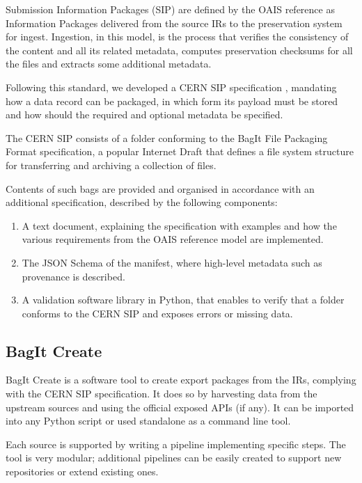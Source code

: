 \documentclass[11pt]{IEEEtran}
\begin{document}
Submission Information Packages (SIP) are defined by the OAIS reference as Information Packages  delivered from the source IRs to the preservation system for ingest. Ingestion, in this model, is the process that verifies the consistency of the content and all its related metadata, computes preservation checksums for all the files and extracts some additional metadata.

Following this standard, we developed a CERN SIP specification \cite{CERNDigitalMemorySIPSpecGitLab-2021-09-15}, mandating how a data record can be packaged, in which form its payload must be stored and how should the required and optional metadata be specified.

The CERN SIP consists of a folder conforming to the BagIt File Packaging Format specification, a popular Internet Draft that defines a file system structure for transferring and archiving a collection of files.

Contents of such bags are provided and organised in accordance with an additional specification, described by the following components:

\begin{enumerate}
    \item A text document, explaining the specification with examples and how the various requirements from the OAIS reference model are implemented.
    \item The JSON Schema of the manifest, where high-level metadata such as provenance is described.
    \item A validation software library in Python, that enables to verify that a folder conforms to the CERN SIP and exposes errors or missing data.
\end{enumerate}

\subsection{BagIt Create}

BagIt Create is a software tool to create export packages from the IRs, complying with the CERN SIP specification. It does so by harvesting data from the upstream sources and using the official exposed APIs (if any). It can be imported into any Python script or used standalone as a command line tool. 

Each source is supported by writing a pipeline implementing specific steps. The tool is very modular; additional pipelines can be easily created to support new repositories or extend existing ones.
\end{document}
